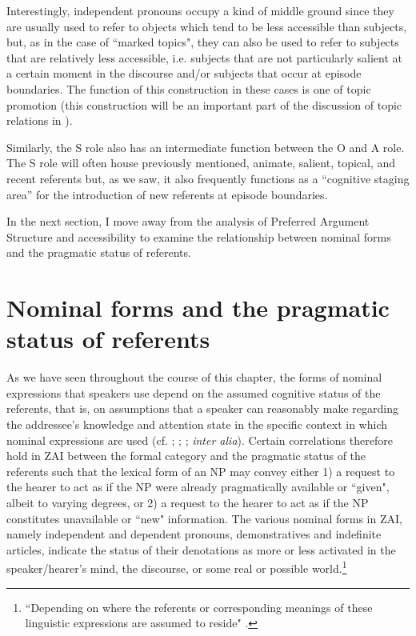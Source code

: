 Interestingly, independent pronouns occupy a kind of middle ground since they are usually used to refer to objects which tend to be less accessible than subjects, but, as in the case of ``marked topics", they can also be used to refer to subjects that are relatively less accessible, i.e. subjects that are not particularly salient at a certain moment in the discourse and/or subjects that occur at episode boundaries. The function of this construction in these cases is one of topic promotion (this construction will be an important part of the discussion of topic relations in ).

Similarly, the S role also has an intermediate function between the O and A role. The S role will often house previously mentioned, animate, salient, topical, and recent referents but, as we saw, it also frequently functions as a ``cognitive staging area'' for the introduction of new referents at episode boundaries.

In the next section, I move away from the analysis of Preferred Argument Structure and accessibility to examine the relationship between nominal forms and the pragmatic status of referents.


\section{Nominal forms and the pragmatic status of referents}\label{nomforms}

As we have seen throughout the course of this chapter, the forms of nominal expressions that speakers use depend on the assumed cognitive status of the referents, that is, on assumptions that a speaker can reasonably make regarding the addressee's knowledge and attention state in the specific context in which nominal expressions are used (cf. \citealt{chafe1976}; \citealt{prince1981}; \citealt{ariel1988}; \textit{inter alia}). Certain correlations therefore hold in ZAI between the formal category and the pragmatic status of the referents such that the lexical form of an NP may convey either 1) a request to the hearer to act as if the NP were already pragmatically available or ``given", albeit  to varying degrees, or 2) a request to the hearer to act as if the NP constitutes unavailable or ``new" information. The various nominal forms in ZAI, namely independent and dependent pronouns, demonstratives and indefinite articles, indicate the status of their denotations as more or less activated in the speaker/hearer's mind, the discourse, or some real or possible world.\footnote{``Depending on where the referents or corresponding meanings of these linguistic expressions are assumed to reside" \citep[177]{gundel2001}.} 

